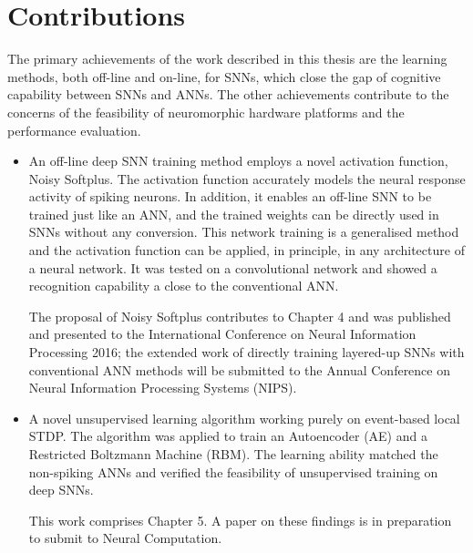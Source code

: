 \section{Contributions}
The primary achievements of the work described in this thesis are the learning methods, both off-line and on-line, for SNNs, which close the gap of cognitive capability between SNNs and ANNs.
The other achievements contribute to the concerns of the feasibility of neuromorphic hardware platforms and the performance evaluation.
\begin{itemize}
%	
	
	\item 
	An off-line deep SNN training method employs a novel activation function, Noisy Softplus.
	The activation function accurately models the neural response activity of spiking neurons.
	In addition, it enables an off-line SNN to be trained just like an ANN, and the trained weights can be directly used in SNNs without any conversion.
	This network training is a generalised method and the activation function can be applied, in principle, in any architecture of a neural network.
	It was tested on a convolutional network and showed a recognition capability a close to the conventional ANN. 

	The proposal of Noisy Softplus contributes to Chapter 4 and was published and presented to the International Conference on Neural Information Processing 2016;
	the extended work of directly training layered-up SNNs with conventional ANN methods will be submitted to the Annual Conference on Neural Information Processing Systems (NIPS).

	\item 
	A novel unsupervised learning algorithm working purely on event-based local STDP.
	The algorithm was applied to train an Autoencoder (AE) and a Restricted Boltzmann Machine (RBM).
	The learning ability matched the non-spiking ANNs and verified the feasibility of unsupervised training on deep SNNs. 
	
	This work comprises Chapter 5.
	A paper on these findings is in preparation to submit to Neural Computation.
	

\end{itemize}
